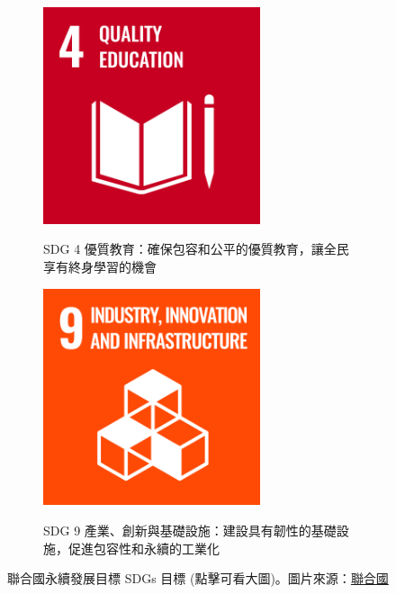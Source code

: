 \documentclass[12pt]{article}
\begin{document}
\begin{figure}[H]
  \centering
  \begin{subfigure}{0.4\linewidth}
    \centering
    \href{https://raw.githubusercontent.com/programingtw/proglearn-plan/main/2023全國大專校院智慧創新暨跨域整合創作競賽/img/E_SDG_PRINT-04.jpg}{ 
      \includegraphics[width=0.7\textwidth]{./img/E_SDG_PRINT-04.jpg}
    }
    \caption{SDG 4 優質教育：確保包容和公平的優質教育，讓全民享有終身學習的機會}
  \end{subfigure}
  \label{arc1}
  \begin{subfigure}{0.4\linewidth}
    \centering
    \href{https://raw.githubusercontent.com/programingtw/proglearn-plan/main/2023全國大專校院智慧創新暨跨域整合創作競賽/img/E_SDG_PRINT-09.jpg}{ 
      \includegraphics[width=0.7\textwidth]{./img/E_SDG_PRINT-09.jpg}
    }
    \caption{SDG 9 產業、創新與基礎設施：建設具有韌性的基礎設施，促進包容性和永續的工業化}
  \end{subfigure}
  \label{arc2}
  \caption{聯合國永續發展目標 SDGs 目標 (點擊可看大圖)。圖片來源：\href{https://www.un.org/sustainabledevelopment/news/communications-material/}{聯合國}}
\end{figure}
\end{document}
